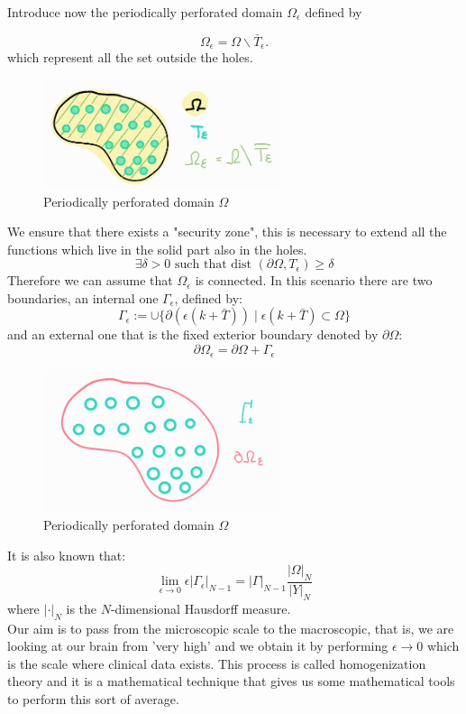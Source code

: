 Introduce now the periodically perforated domain $\Omega_{\epsilon}$ defined by

$$
\Omega_{\epsilon}=\Omega \backslash \bar{T}_{\epsilon} .
$$
which represent all the set outside the holes.\\

\begin{figure}[H]
   \centering
   \includegraphics[width=7cm]{periodicallyperforateddomain.jpg}
   \caption{Periodically perforated domain $\Omega$}
    \label{fig:Omega_epsilon}
\end{figure}

We ensure that there exists a "security zone", this is necessary to extend all the functions which live in the solid part also in the holes.
\begin{equation}
  \exists \delta>0 \text { such that dist }\left(\partial \Omega, T_{\epsilon}\right) \geq \delta
\label{eq 8}\end{equation}
Therefore we can assume that $\Omega_{\epsilon}$ is connected. In this scenario there are two boundaries, an internal one $\Gamma_{\epsilon}$, defined by:
$$
\Gamma_{\epsilon}:=\cup\{\partial(\epsilon(k+\bar{T})) \mid \epsilon(k+\bar{T}) \subset \Omega\}
$$
and an external one that is the fixed exterior boundary denoted by $\partial \Omega$:
$$
\partial\Omega_{\epsilon}=\partial\Omega+\Gamma_{\epsilon}
$$
\begin{figure}[H]
   \centering
   \includegraphics[width=7cm]{boundary.jpg}
   \caption{Periodically perforated domain $\Omega$}
    \label{fig:Omega_epsilon2}
\end{figure}
It is also known that:
\begin{equation}
  \lim _{\epsilon \rightarrow 0} \epsilon\left|\Gamma_{\epsilon}\right|_{N-1}=|\Gamma|_{N-1} \frac{|\Omega|_{N}}{|Y|_{N}}
\label{eq 9}\end{equation}
where $|\cdot|_{N}$ is the $N$-dimensional Hausdorff measure.\\ Our aim is to pass from the microscopic scale to the macroscopic, that is, we are looking at our brain from 'very high' and we obtain it by performing $\epsilon \rightarrow 0$ which is the scale where clinical data exists. This process is called homogenization theory and it is a mathematical technique that gives us some mathematical tools to perform this sort of average.
